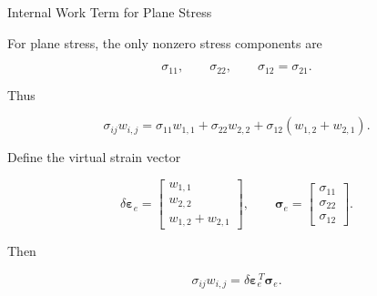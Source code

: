 \documentclass[aspectratio=169]{beamer}
\begin{document}
\begin{frame}{Internal Work Term for Plane Stress}

For plane stress, the only nonzero stress components are

\[
\sigma_{11},\qquad \sigma_{22},\qquad \sigma_{12}=\sigma_{21}.
\]

Thus

\[
\sigma_{ij} w_{i,j}
=
\sigma_{11} w_{1,1}
+\sigma_{22} w_{2,2}
+\sigma_{12}(w_{1,2}+w_{2,1}).
\]

Define the virtual strain vector

\[
\delta\boldsymbol{\varepsilon}_e=
\begin{bmatrix}
w_{1,1}\\[4pt]
w_{2,2}\\[4pt]
w_{1,2}+w_{2,1}
\end{bmatrix},
\qquad
\boldsymbol{\sigma}_e=
\begin{bmatrix}
\sigma_{11}\\[4pt]
\sigma_{22}\\[4pt]
\sigma_{12}
\end{bmatrix}.
\]

Then

\[
\sigma_{ij} w_{i,j}
=
\delta\boldsymbol{\varepsilon}_e^{\,T}\boldsymbol{\sigma}_e.
\]

\end{frame}
\end{document}
